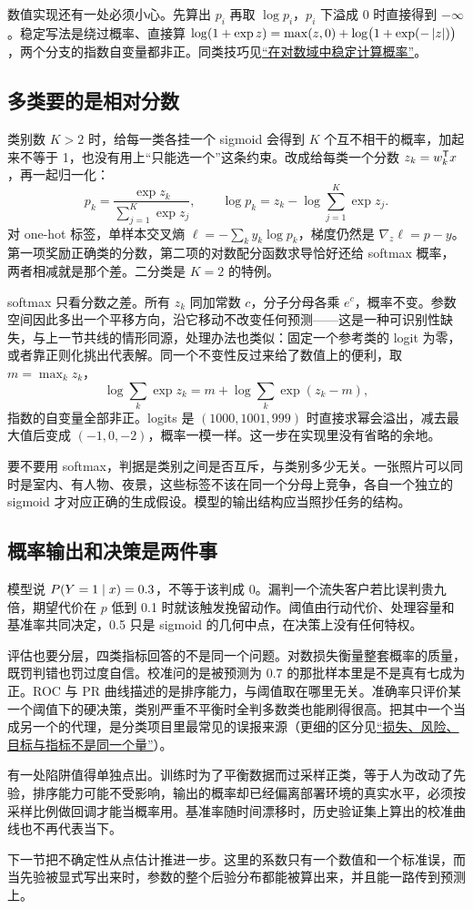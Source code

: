 数值实现还有一处必须小心。先算出 \(p_i\) 再取 \(\log p_i\)，\(p_i\) 下溢成 0 时直接得到 \(-\infty\)。稳定写法是绕过概率、直接算 \(\log(1+\exp z)=\max(z,0)+\log\bigl(1+\exp(-\left|z\right|)\bigr)\)，两个分支的指数自变量都非正。同类技巧见\hyperref[sec:08-Numerical-Analysis/07-Numerical-Methods-for-ML/01]{``在对数域中稳定计算概率''}。

\subsection{多类要的是相对分数}

类别数 \(K>2\) 时，给每一类各挂一个 sigmoid 会得到 \(K\) 个互不相干的概率，加起来不等于 1，也没有用上``只能选一个''这条约束。改成给每类一个分数 \(z_k=w_k^{\mathsf{T}}x\)，再一起归一化：
\[
p_k=\frac{\exp z_k}{\sum_{j=1}^{K}\exp z_j},
\qquad
\log p_k=z_k-\log\sum_{j=1}^{K}\exp z_j .
\]
对 one-hot 标签，单样本交叉熵 \(\ell=-\sum_k y_k\log p_k\)，梯度仍然是 \(\nabla_z\ell=p-y\)。第一项奖励正确类的分数，第二项的对数配分函数求导恰好还给 softmax 概率，两者相减就是那个差。二分类是 \(K=2\) 的特例。

softmax 只看分数之差。所有 \(z_k\) 同加常数 \(c\)，分子分母各乘 \(e^{c}\)，概率不变。参数空间因此多出一个平移方向，沿它移动不改变任何预测——这是一种可识别性缺失，与上一节共线的情形同源，处理办法也类似：固定一个参考类的 logit 为零，或者靠正则化挑出代表解。同一个不变性反过来给了数值上的便利，取 \(m=\max_k z_k\)，
\[
\log\sum_k\exp z_k=m+\log\sum_k\exp(z_k-m),
\]
指数的自变量全部非正。logits 是 \((1000,1001,999)\) 时直接求幂会溢出，减去最大值后变成 \((-1,0,-2)\)，概率一模一样。这一步在实现里没有省略的余地。

要不要用 softmax，判据是类别之间是否互斥，与类别多少无关。一张照片可以同时是室内、有人物、夜景，这些标签不该在同一个分母上竞争，各自一个独立的 sigmoid 才对应正确的生成假设。模型的输出结构应当照抄任务的结构。

\subsection{概率输出和决策是两件事}

模型说 \(P(Y=1\mid x)=0.3\)，不等于该判成 0。漏判一个流失客户若比误判贵九倍，期望代价在 \(p\) 低到 0.1 时就该触发挽留动作。阈值由行动代价、处理容量和基准率共同决定，0.5 只是 sigmoid 的几何中点，在决策上没有任何特权。

评估也要分层，四类指标回答的不是同一个问题。对数损失衡量整套概率的质量，既罚判错也罚过度自信。校准问的是被预测为 0.7 的那批样本里是不是真有七成为正。ROC 与 PR 曲线描述的是排序能力，与阈值取在哪里无关。准确率只评价某一个阈值下的硬决策，类别严重不平衡时全判多数类也能刷得很高。把其中一个当成另一个的代理，是分类项目里最常见的误报来源（更细的区分见\hyperref[sec:13-Machine-Learning/01-Learning-Problems-and-Evaluation/02]{``损失、风险、目标与指标不是同一个量''}）。

有一处陷阱值得单独点出。训练时为了平衡数据而过采样正类，等于人为改动了先验，排序能力可能不受影响，输出的概率却已经偏离部署环境的真实水平，必须按采样比例做回调才能当概率用。基准率随时间漂移时，历史验证集上算出的校准曲线也不再代表当下。

下一节把不确定性从点估计推进一步。这里的系数只有一个数值和一个标准误，而当先验被显式写出来时，参数的整个后验分布都能被算出来，并且能一路传到预测上。
